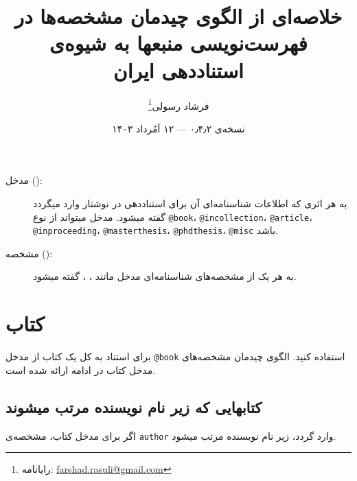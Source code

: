 \documentclass[a4paper,11pt]{article}
\begin{document}
\title{خلاصه‌ای از الگوی چیدمان مشخصه‌ها در فهرست‌نویسی منبعها به شیوه‌ی استناددهی ایران}
\author{فرشاد رسولی\thanks{رایانامه: \url{farshad.rasuli@gmail.com}}}
\date{نسخه‌ی ۰٫۴٫۲ --- ۱۲ اَمُرداد ۱۴۰۳}
\maketitle


\begin{description}
\item[مدخل ():]
به هر اثری که اطلاعات شناسنامه‌ای آن برای استناددهی  در نوشتار وارد میگردد گفته میشود. مدخل میتواند از نوع \verb|@book|، \verb|@incollection|، \verb|@article|، \verb|@inproceeding|، \verb|@masterthesis|، \verb|@phdthesis|، \verb|@misc| باشد.
\item[مشخصه ():]
به هر یک از مشخصه‌های شناسنامه‌ای مدخل مانند ، ،  گفته میشود.
\end{description}



\renewcommand{\contentsname}{فهرست}
\tableofcontents










\section{کتاب}
برای استناد به کل یک کتاب از مدخل \verb|@book| استفاده کنید. الگوی چیدمان مشخصه‌های مدخل کتاب در ادامه ارائه شده است.





\subsection{کتابهایی که زیر نام نویسنده مرتب میشوند}
اگر برای مدخل کتاب، مشخصه‌ی \verb|author| وارد گردد، زیر نام نویسنده مرتب میشود.
\end{document}
